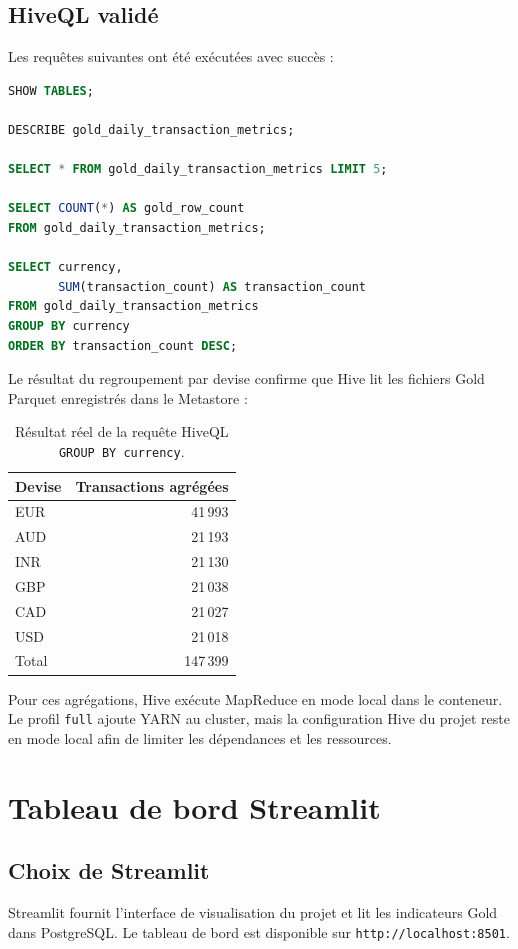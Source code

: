\documentclass[11pt,a4paper]{report}
\begin{document}
\section{HiveQL validé}
Les requêtes suivantes ont été exécutées avec succès :
\begin{lstlisting}[language=SQL,caption={Démonstration HiveQL locale}]
SHOW TABLES;

DESCRIBE gold_daily_transaction_metrics;

SELECT * FROM gold_daily_transaction_metrics LIMIT 5;

SELECT COUNT(*) AS gold_row_count
FROM gold_daily_transaction_metrics;

SELECT currency,
       SUM(transaction_count) AS transaction_count
FROM gold_daily_transaction_metrics
GROUP BY currency
ORDER BY transaction_count DESC;
\end{lstlisting}

Le résultat du regroupement par devise confirme que Hive lit les fichiers Gold
Parquet enregistrés dans le Metastore :

\begin{table}[H]
\centering
\begin{tabular}{lr}
\toprule
\textbf{Devise} & \textbf{Transactions agrégées}\\
\midrule
EUR & 41\,993\\
AUD & 21\,193\\
INR & 21\,130\\
GBP & 21\,038\\
CAD & 21\,027\\
USD & 21\,018\\
\midrule
Total & 147\,399\\
\bottomrule
\end{tabular}
\caption{Résultat réel de la requête HiveQL \texttt{GROUP BY currency}.}
\label{tab:hiveql-result}
\end{table}

Pour ces agrégations, Hive exécute MapReduce en mode local dans le conteneur.
Le profil \texttt{full} ajoute YARN au cluster, mais la configuration Hive du
projet reste en mode local afin de limiter les dépendances et les ressources.

\chapter{Tableau de bord Streamlit}

\section{Choix de Streamlit}
Streamlit fournit l'interface de visualisation du projet et lit les indicateurs
Gold dans PostgreSQL. Le tableau de bord est disponible sur
\texttt{http://localhost:8501}.
\end{document}
